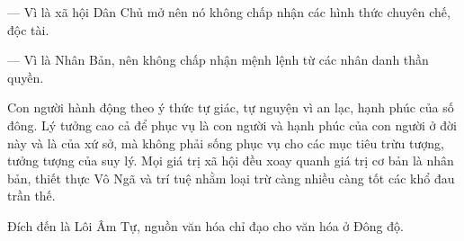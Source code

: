 — Vì là xã hội Dân Chủ mở nên nó không chấp nhận các hình thức chuyên chế, độc tài.

— Vì là Nhân Bản, nên không chấp nhận mệnh lệnh từ các nhân danh thần quyền.

Con người hành động theo ý thức tự giác, tự nguyện vì an lạc, hạnh phúc của số đông. Lý tưởng cao cả để phục vụ là con người và hạnh phúc của con người ở đời này và là của xứ sở, mà không phải sống phục vụ cho các mục tiêu trừu tượng, tưởng tượng của suy lý. Mọi giá trị xã hội đều xoay quanh giá trị cơ bản là nhân bản, thiết thực Vô Ngã và trí tuệ nhằm loại trừ càng nhiều càng tốt các khổ đau trần thế.

Đích đến là Lôi Âm Tự, nguồn văn hóa chỉ đạo cho văn hóa ở Đông độ.
